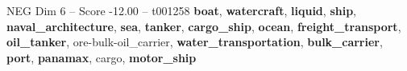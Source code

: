 \begin{textsample}{NEG Dim 6 – Score -12.00 – t001258}  \label{ex:f6_neg_006}
\textbf{boat}, \textbf{watercraft}, \textbf{liquid}, \textbf{ship}, \textbf{naval\_architecture}, \textbf{sea}, \textbf{tanker}, \textbf{cargo\_ship}, \textbf{ocean}, \textbf{freight\_transport}, \textbf{oil\_tanker}, ore-bulk-oil\_carrier, \textbf{water\_transportation}, \textbf{bulk\_carrier}, \textbf{port}, \textbf{panamax}, cargo, \textbf{motor\_ship}

\end{textsample}
